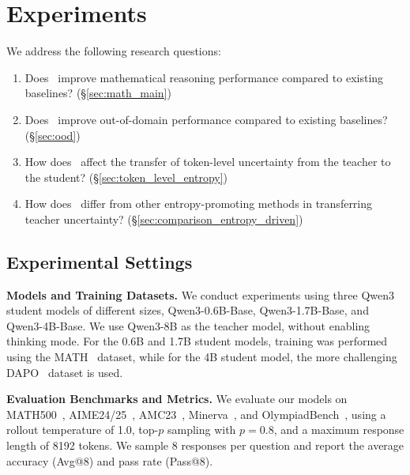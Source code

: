 \section{Experiments}
\label{sec:experiments}
We address the following research questions:
\begin{enumerate}[leftmargin=2.7em, itemsep=0.2mm, topsep=1pt]
  \item[\textcolor{text_green}{\textbf{RQ1:}}] Does \method~improve mathematical reasoning performance compared to existing baselines? (\S\ref{sec:math_main})
  \item[\textcolor{text_green}{\textbf{RQ2:}}] Does \method~improve out-of-domain performance compared to existing baselines? (\S\ref{sec:ood})
  \item[\textcolor{text_green}{\textbf{RQ3:}}] How does \method~affect the transfer of token-level uncertainty from the teacher to the student? (\S\ref{sec:token_level_entropy})
  \item[\textcolor{text_green}{\textbf{RQ4:}}] How does \method~differ from other entropy-promoting methods in transferring teacher uncertainty? (\S\ref{sec:comparison_entropy_driven})
\end{enumerate}
\subsection{Experimental Settings} \label{sec:experimental_settings}
\textbf{Models and Training Datasets.}
We conduct experiments using three Qwen3~\cite{yang2025qwen3} student models of different sizes, Qwen3-0.6B-Base, Qwen3-1.7B-Base, and Qwen3-4B-Base. We use Qwen3-8B as the teacher model, without enabling thinking mode. For the 0.6B and 1.7B student models, training was performed using the MATH~\cite{hendrycks2021measuring} dataset, while for the 4B student model, the more challenging DAPO~\cite{yu2025dapo} dataset is used.

\textbf{Evaluation Benchmarks and Metrics.}
We evaluate our models on MATH500~\cite{hendrycks2021measuring}, AIME24/25~\cite{maa_aime}, AMC23~\cite{maa_amc}, Minerva~\cite{lewkowycz2022solving}, and OlympiadBench~\cite{he2024olympiadbench}, using a rollout temperature of 1.0, top-$p$ sampling with $p = 0.8$, and a maximum response length of 8192 tokens.
We sample 8 responses per question and report the average accuracy (Avg@8) and pass rate (Pass@8).

